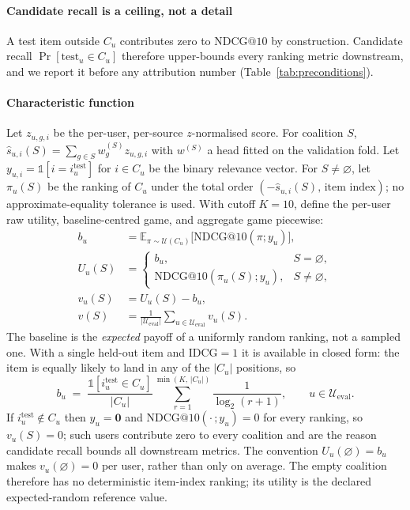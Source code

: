 \documentclass[pdflatex,sn-basic,Numbered]{sn-jnl}
\makeatletter
\theoremstyle{plain}
\theoremstyle{definition}
\newcommand{\Cu}{C_u}
\newcommand{\Ueval}{\mathcal{U}_{\mathrm{eval}}}
\newcommand{\NDCG}{\mathrm{NDCG@10}}
\makeatother
\begin{document}
\paragraph{Candidate recall is a ceiling, not a detail}
A test item outside $\Cu$ contributes zero to $\NDCG$ by construction.
Candidate recall $\Pr[\text{test}_u \in \Cu]$ therefore upper-bounds every
ranking metric downstream, and we report it before any attribution number
(Table~\ref{tab:preconditions}).

\paragraph{Characteristic function}

Let $z_{u,g,i}$ be the per-user, per-source $z$-normalised score. For coalition
$S$, $\hat{s}_{u,i}(S) = \sum_{g \in S} w_g^{(S)} z_{u,g,i}$ with $w^{(S)}$ a
head fitted on the validation fold. Let
$y_{u,i} = \mathbb{1}[i = i_u^{\mathrm{test}}]$ for $i \in \Cu$ be the
binary relevance vector. For $S\ne\varnothing$, let $\pi_u(S)$ be the ranking
of $\Cu$ under the total order
$(-\hat{s}_{u,i}(S),\,\text{item index})$; no approximate-equality tolerance is
used. With cutoff $K=10$, define the per-user raw utility, baseline-centred
game, and aggregate game piecewise:
\begin{align}
b_u    &= \mathbb{E}_{\pi \sim \mathcal{U}(\Cu)}\bigl[\NDCG(\pi; y_u)\bigr],
          \nonumber \\
U_u(S) &=
\begin{cases}
b_u, & S=\varnothing,\\
\NDCG(\pi_u(S);y_u), & S\ne\varnothing,
\end{cases}
\nonumber \\
v_u(S) &= U_u(S)-b_u, \nonumber \\
v(S)   &= \frac{1}{|\Ueval|}\sum_{u\in\Ueval} v_u(S).
\label{eq:game}
\end{align}
The baseline is the \emph{expected} payoff of a uniformly random ranking, not a
sampled one. With a single held-out item and $\mathrm{IDCG}=1$ it is available
in closed form: the item is equally likely to land in any of the $|\Cu|$
positions, so
%
\begin{equation}
b_u \;=\;
\frac{\mathbb 1[i_u^{\mathrm{test}}\in C_u]}{|\Cu|}
\sum_{r=1}^{\min(K,\,|\Cu|)}\frac{1}{\log_2(r+1)},
\qquad u\in\Ueval .
\label{eq:baseline}
\end{equation}
%
If $i_u^{\mathrm{test}} \notin \Cu$ then $y_u = \mathbf{0}$ and
$\NDCG(\cdot\,; y_u) = 0$ for every ranking, so $v_u(S) = 0$; such users
contribute zero to every coalition and are the reason candidate recall bounds
all downstream metrics. The convention $U_u(\varnothing)=b_u$ makes
$v_u(\varnothing)=0$ per user, rather than only on average. The empty coalition
therefore has no deterministic item-index ranking; its utility is the declared
expected-random reference value.
\end{document}
